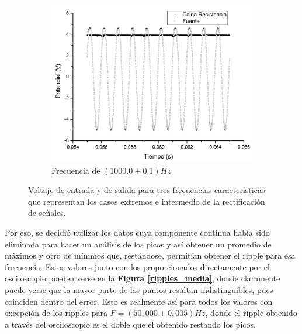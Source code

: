 \documentclass[11pt,a4paper]{article}
\begin{document}
\begin{figure}
\begin{subfigure}{0.33\textwidth}
\includegraphics[scale=0.25]{Rectificacion_1000hz}
  \caption{Frecuencia de $(1000.0\pm0.1)Hz$}
  \label{subfig:rec_1000}
\end{subfigure}
  \caption{Voltaje de entrada y de salida para tres frecuencias características que representan los casos extremos e intermedio de la rectificación de señales. }
  \label{fig:rectificaciones}
\end{figure}

Por eso, se decidió utilizar los datos cuya componente continua había sido eliminada para hacer un análisis de los picos y así obtener un promedio de máximos y otro de mínimos que, restándose, permitían obtener el ripple para esa frecuencia. Estos valores junto con los proporcionados directamente por el osciloscopio pueden verse en la \textbf{Figura \ref{ripples_media}}, donde claramente puede verse que la mayor parte de los puntos resultan indistinguibles, pues coinciden dentro del error. Esto es realmente así para todos los valores con excepción de los ripples para $F = (50,000 \pm 0,005)Hz$, donde el ripple obtenido a través del osciloscopio es el doble que el obtenido restando los picos. 
\end{document}
